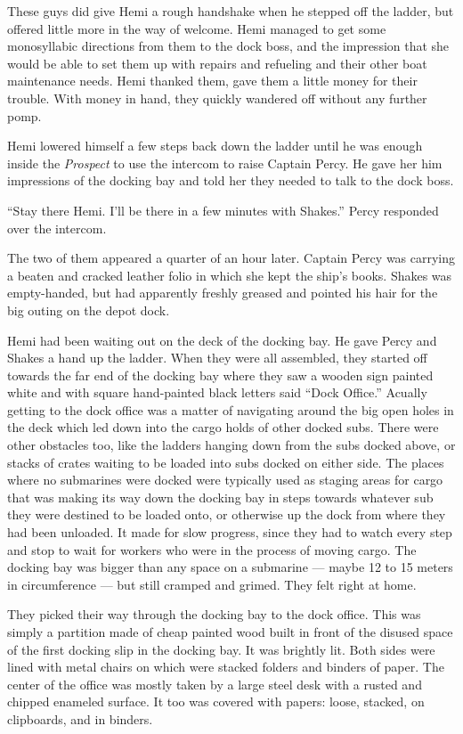 \documentclass[]{scrbook}
\begin{document}
These guys did give Hemi a rough handshake when he stepped off the
ladder, but offered little more in the way of welcome. Hemi managed to
get some monosyllabic directions from them to the dock boss, and the
impression that she would be able to set them up with repairs and
refueling and their other boat maintenance needs. Hemi thanked them,
gave them a little money for their trouble. With money in hand, they
quickly wandered off without any further pomp.

Hemi lowered himself a few steps back down the ladder until he was
enough inside the \emph{Prospect} to use the intercom to raise Captain
Percy. He gave her him impressions of the docking bay and told her they
needed to talk to the dock boss.

``Stay there Hemi. I'll be there in a few minutes with Shakes.'' Percy
responded over the intercom.

The two of them appeared a quarter of an hour later. Captain Percy was
carrying a beaten and cracked leather folio in which she kept the ship's
books. Shakes was empty-handed, but had apparently freshly greased and
pointed his hair for the big outing on the depot dock.

Hemi had been waiting out on the deck of the docking bay. He gave Percy
and Shakes a hand up the ladder. When they were all assembled, they
started off towards the far end of the docking bay where they saw a
wooden sign painted white and with square hand-painted black letters
said ``Dock Office.'' Acually getting to the dock office was a matter of
navigating around the big open holes in the deck which led down into the
cargo holds of other docked subs. There were other obstacles too, like
the ladders hanging down from the subs docked above, or stacks of crates
waiting to be loaded into subs docked on either side. The places where
no submarines were docked were typically used as staging areas for cargo
that was making its way down the docking bay in steps towards whatever
sub they were destined to be loaded onto, or otherwise up the dock from
where they had been unloaded. It made for slow progress, since they had
to watch every step and stop to wait for workers who were in the process
of moving cargo. The docking bay was bigger than any space on a
submarine --- maybe 12 to 15 meters in circumference --- but still
cramped and grimed. They felt right at home.

They picked their way through the docking bay to the dock office. This
was simply a partition made of cheap painted wood built in front of the
disused space of the first docking slip in the docking bay. It was
brightly lit. Both sides were lined with metal chairs on which were
stacked folders and binders of paper. The center of the office was
mostly taken by a large steel desk with a rusted and chipped enameled
surface. It too was covered with papers: loose, stacked, on clipboards,
and in binders.
\end{document}
